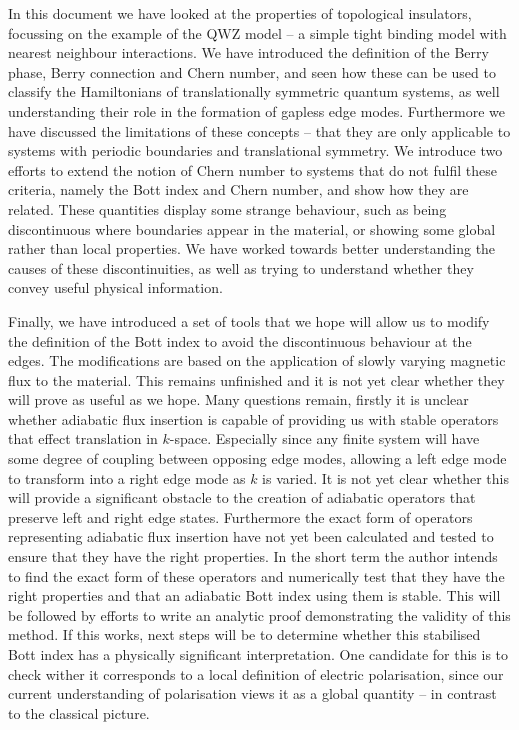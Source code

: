 
In this document we have looked at the properties of topological insulators, focussing on the example of the QWZ model -- a simple tight binding model with nearest neighbour interactions. We have introduced the definition of the Berry phase, Berry connection and Chern number, and seen how these can be used to classify the Hamiltonians of translationally symmetric quantum systems, as well understanding their role in the formation of gapless edge modes. Furthermore we have discussed the limitations of these concepts -- that they are only applicable to systems with periodic boundaries and translational symmetry. We introduce two efforts to extend the notion of Chern number to systems that do not fulfil these criteria, namely the Bott index and Chern number, and show how they are related. These quantities display some strange behaviour, such as being discontinuous where boundaries appear in the material, or showing some global rather than local properties. We have worked towards better understanding the causes of these discontinuities, as well as trying to understand whether they convey useful physical information. \par
Finally, we have introduced a set of tools that we hope will allow us to modify the definition of the Bott index to avoid the discontinuous behaviour at the edges. The modifications are based on the application of slowly varying magnetic flux to the material. This remains unfinished and it is not yet clear whether they will prove as useful as we hope. Many questions remain, firstly it is unclear whether adiabatic flux insertion is capable of providing us with stable operators that effect translation in $k$-space. Especially since any finite system will have some degree of coupling between opposing edge modes, allowing a left edge mode to transform into a right edge mode as $k$ is varied. It is not yet clear whether this will provide a significant obstacle to the creation of adiabatic operators that preserve left and right edge states. Furthermore the exact form of operators representing adiabatic flux insertion have not yet been calculated and tested to ensure that they have the right properties. In the short term the author intends to find the exact form of these operators and numerically test that they have the right properties and that an adiabatic Bott index using them is stable. This will be followed by efforts to write an analytic proof demonstrating the validity of this method. If this works, next steps will be to determine whether this stabilised Bott index has a physically significant interpretation. One candidate for this is to check wither it corresponds to a local definition of electric polarisation, since our current understanding of polarisation views it as a global quantity \cite{vanderbilt_berry_2018} -- in contrast to the classical picture. \par
